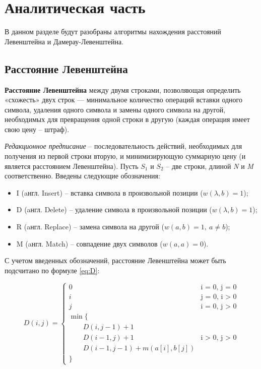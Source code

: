 \chapter{Аналитическая часть}

В данном разделе будут разобраны алгоритмы нахождения расстояний Левенштейна и Дамерау-Левенштейна.

\section{Расстояние Левенштейна}

\textbf{Расстояние Левенштейна} между двумя строками, позволяющая определить «схожесть» двух строк — минимальное количество операций вставки одного символа, удаления одного символа и замены одного символа на другой, необходимых для превращения одной строки в другую (каждая операция имеет свою цену -- штраф). \newline

\textit{Редакционное предписание} -- последовательность действий, необходимых для получения из первой строки вторую, и минимизирующую суммарную цену (и является расстоянием Левенштейна).\newline
Пусть $S_{1}$ и $S_{2}$ -- две строки, длиной \textit{N} и \textit{M} соответственно. 
Введены следующие обозначения:
\begin{itemize}
        \item I (aнгл. Insert) -- вставка символа в произвольной позиции ($w(\lambda,b)=1$);
        \item D (aнгл. Delete) -- удаление символа в произвольной позиции ($w(\lambda,b)=1$);
        \item R (aнгл. Replace) -- замена символа на другой ($w(a,b)=1, \medspace a \neq b$);
        \item M (aнгл. Match) -- совпадение двух символов ($w(a,a)=0$). \newline
\end{itemize}

С учетом введенных обозначений, расстояние Левенштейна может быть подсчитано по формуле \ref{eq:D}:

\begin{equation}
	\label{eq:D}
	D(i, j) = \begin{cases}

		0 &\text{i = 0, j = 0}\\
		i &\text{j = 0, i > 0}\\
		j &\text{i = 0, j > 0}\\
		\min \lbrace \\
		\qquad D(i, j-1) + 1\\
		\qquad D(i-1, j) + 1 &\text{i > 0, j > 0}\\
		\qquad D(i-1, j-1) + m(a[i], b[j]) \\
		\rbrace
	\end{cases}
\end{equation}


